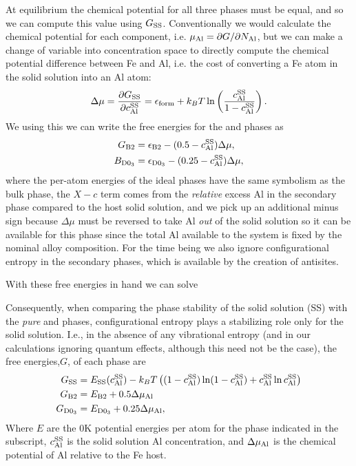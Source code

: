 At equilibrium the chemical potential for all three phases must be equal, and so we can compute this value using $G_{\mathrm{SS}}$.
Conventionally we would calculate the chemical potential for each component, i.e. $\mu_{\mathrm{Al}} = \partial G / \partial N_{\mathrm{Al}}$,
but we can make a change of variable into concentration space to directly compute the chemical potential difference between Fe and Al, i.e. the cost of converting a Fe atom in the solid solution into an Al atom:
%
\begin{equation}
    \label{eq:ss_chem_pot}
    \Delta \mu = \frac{\partial G_{\mathrm{SS}}}{\partial c_{\mathrm{Al}}^{\mathrm{SS}}} = \epsilon_{\mathrm{form}} + k_B T \ln \left(\frac{c_{\mathrm{Al}}^{\mathrm{SS}}}{1 - c_{\mathrm{Al}}^{\mathrm{SS}}} \right).
\end{equation}
%
We using this we can write the free energies for the \BTWO and \DOTHREE phases as
%
\begin{eqnarray}
    G_{\mathrm{B}2} &= \epsilon_{\mathrm{B}2} - (0.5 - c_{\mathrm{Al}}^{\mathrm{SS}})\Delta \mu, \label{eq:b2_super_simple} \\
    B_{\mathrm{D}0_3} &= \epsilon_{\mathrm{D}0_3} - (0.25 - c_{\mathrm{Al}}^{\mathrm{SS}})\Delta \mu, \label{eq:d03_super_simple}
\end{eqnarray}
%
where the per-atom energies of the ideal phases have the same symbolism as the bulk phase, the $X-c$ term comes from the \emph{relative} excess Al in the secondary phase compared to the host solid solution, and we pick up an additional minus sign because $\Delta \mu$ must be reversed to take Al \emph{out} of the solid solution so it can be available for this phase since the total Al available to the system is fixed by the nominal alloy composition.
For the time being we also ignore configurational entropy in the secondary phases, which is available by the creation of antisites.

With these free energies in hand we can solve

Consequently, when comparing the phase stability of the solid solution (SS) with the \emph{pure} \BTWO and \DOTHREE phases, configurational entropy plays a stabilizing role only for the solid solution.
I.e., in the absence of any vibrational entropy (and in our calculations ignoring quantum effects, although this need not be the case), the free energies,$G$, of each phase are
%
\begin{multline}
    \label{eq:vs_pure_phases}
    \begin{split}
        G_{\mathrm{SS}} &= E_{\mathrm{SS}}(c_{\mathrm{Al}}^{\mathrm{SS}}) -k_B T \left( (1-c_{\mathrm{Al}}^{\mathrm{SS}})\ln(1 - c_{\mathrm{Al}}^{\mathrm{SS}}) + c_{\mathrm{Al}}^{\mathrm{SS}}\ln c_{\mathrm{Al}}^{\mathrm{SS}} \right)\\
        G_{\mathrm{B}2} &= E_{\mathrm{B}2} + 0.5 \Delta \mu_{\mathrm{Al}} \\
        G_{\mathrm{D}0_3} &= E_{\mathrm{D}0_3} + 0.25 \Delta \mu_{\mathrm{Al}},
    \end{split}
\end{multline}
%
Where $E$ are the 0K potential energies per atom for the phase indicated in the subscript, $c_{\mathrm{Al}}^{\mathrm{SS}}$ is the solid solution Al concentration, and $\Delta \mu_{\mathrm{Al}}$ is the chemical potential of Al relative to the Fe host.

